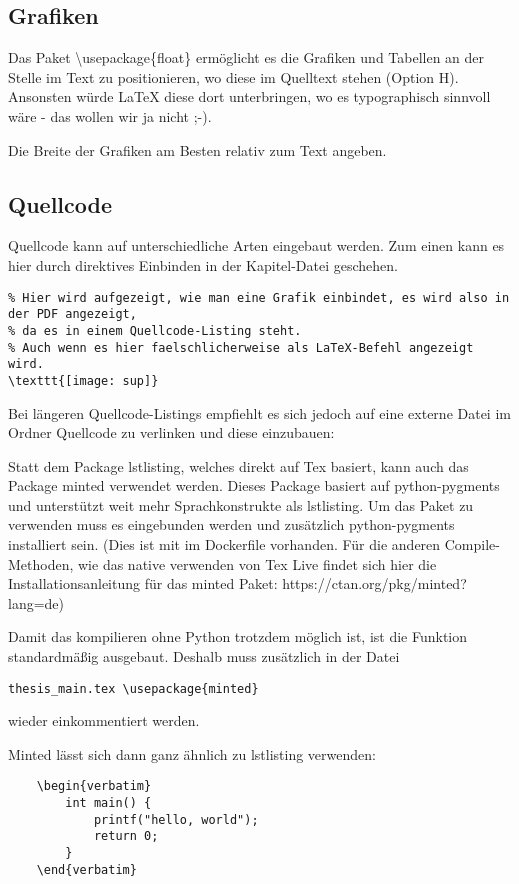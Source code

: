 \subsection{Grafiken}
Das Paket \textbackslash usepackage\{float\} ermöglicht es die Grafiken und Tabellen an der Stelle im Text zu positionieren, wo diese im Quelltext stehen (Option H). Ansonsten würde \LaTeX{} diese dort unterbringen, wo es typographisch sinnvoll wäre - das wollen wir ja nicht ;-).

Die Breite der Grafiken am Besten relativ zum Text angeben.

\subsection{Quellcode}
Quellcode kann auf unterschiedliche Arten eingebaut werden.
Zum einen kann es hier durch direktives Einbinden in der Kapitel-Datei geschehen.
\begin{lstlisting}
% Hier wird aufgezeigt, wie man eine Grafik einbindet, es wird also in der PDF angezeigt,
% da es in einem Quellcode-Listing steht.
% Auch wenn es hier faelschlicherweise als LaTeX-Befehl angezeigt wird.
\texttt{[image: sup]}
\end{lstlisting}

Bei längeren Quellcode-Listings empfiehlt es sich jedoch auf eine externe Datei im Ordner Quellcode zu verlinken und diese einzubauen:


Statt dem Package lstlisting, welches direkt auf Tex basiert, kann auch das Package minted verwendet werden.
Dieses Package basiert auf python-pygments und unterstützt weit mehr Sprachkonstrukte als lstlisting.
Um das Paket zu verwenden muss es eingebunden werden und zusätzlich python-pygments installiert sein.
(Dies ist mit im Dockerfile vorhanden. Für die anderen Compile-Methoden, wie das native verwenden von Tex Live findet sich hier die Installationsanleitung für das minted Paket: https://ctan.org/pkg/minted?lang=de)

Damit das kompilieren ohne Python trotzdem möglich ist, ist die Funktion standardmäßig ausgebaut. Deshalb muss zusätzlich in der Datei \begin{verbatim}thesis_main.tex \usepackage{minted} \end{verbatim} wieder einkommentiert werden. 

Minted lässt sich dann ganz ähnlich zu lstlisting verwenden:
\begin{lstlisting}
	\begin{verbatim}
		int main() {
			printf("hello, world");
			return 0;
		}
	\end{verbatim}
\end{lstlisting}	

